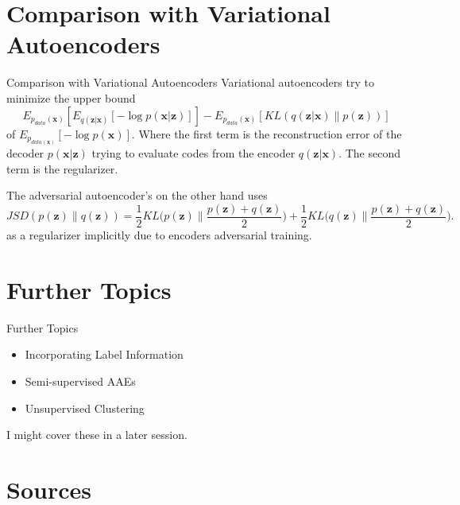\documentclass{beamer}
\begin{document}
\section{Comparison with Variational Autoencoders}

\begin{frame}{Comparison with Variational Autoencoders}
  Variational autoencoders try to minimize the upper bound
  \begin{equation*}
    E_{p_{data}(\mathbf{x})}[E_{q(\mathbf{z}|\mathbf{x})}[ -\log p(\mathbf{x}|\mathbf{z})]]
    - E_{p_{data}(\mathbf{x})}[KL( q(\mathbf{z}|\mathbf{x})\| p(\mathbf{z}))]
  \end{equation*}
  of $E_{p_{data(\mathbf{x})}}[- \log p(\mathbf{x})]$. Where the first term is the reconstruction error of the decoder
  $p(\mathbf{x}|\mathbf{z})$ trying to evaluate codes from the encoder $q(\mathbf{z}|\mathbf{x})$.
  The second term is the regularizer.

  The adversarial autoencoder's on the other hand uses
  \begin{equation*}
    JSD(p(\mathbf{z})\| q(\mathbf{z})) = \frac{1}{2}KL\Big( p(\mathbf{z})\Big\| \frac{p(\mathbf{z}) + q(\mathbf{z})}{2}\Big)
    +  \frac{1}{2}KL\Big( q(\mathbf{z})\Big\| \frac{p(\mathbf{z}) + q(\mathbf{z})}{2}\Big).
  \end{equation*}
  as a regularizer implicitly due to encoders adversarial training.
\end{frame}

\section{Further Topics}

\begin{frame}{Further Topics}

  \begin{itemize}
    \item Incorporating Label Information
    \item Semi-supervised AAEs
    \item Unsupervised Clustering
  \end{itemize}
  I might cover these in a later session.

\end{frame}


\section{Sources}
\end{document}
